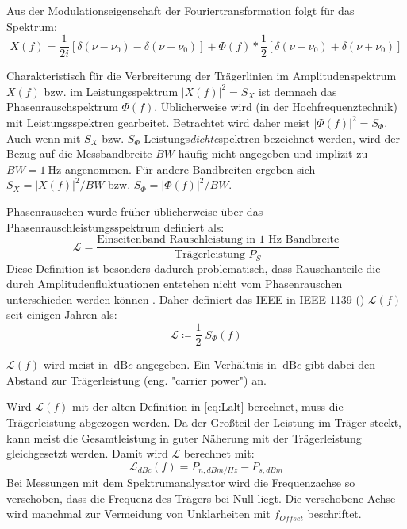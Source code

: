 Aus der Modulationseigenschaft der Fouriertransformation folgt für das Spektrum:
\begin{equation}
	X(f) = \frac{1}{2 i} \left[ \delta(\nu-\nu_0) - \delta(\nu+\nu_0) \right] + \Phi(f) * \frac{1}{2} \left[ \delta(\nu-\nu_0) + \delta(\nu+\nu_0) \right]
\end{equation}

Charakteristisch für die Verbreiterung der Trägerlinien im Amplitudenspektrum $X(f)$ bzw. im Leistungsspektrum $|X(f)|^2=S_X$ ist demnach das Phasenrauschspektrum $\Phi(f)$. Üblicherweise wird (in der Hochfrequenztechnik) mit Leistungsspektren gearbeitet. Betrachtet wird daher meist $|\Phi(f)|^2=S_\Phi$. Auch wenn mit $S_X$ bzw. $S_\Phi$ Leistungs\textit{dichte}spektren bezeichnet werden, wird der Bezug auf die Messbandbreite $BW$ häufig nicht angegeben und implizit zu $BW=\SI{1}{\hertz}$ angenommen. Für andere Bandbreiten ergeben sich $S_X=|X(f)|^2/BW$ bzw. $S_\Phi=|\Phi(f)|^2/BW$.

Phasenrauschen wurde früher üblicherweise über das Phasenrauschleistungsspektrum definiert als:
\begin{equation}
\label{eq:Lalt}
	\mathscr{L} = \frac{\text{Einseitenband-Rauschleistung in 1 Hz Bandbreite}}{\text{Trägerleistung } P_S}
\end{equation}
Diese Definition ist besonders dadurch problematisch, dass Rauschanteile die durch Amplitudenfluktuationen entstehen nicht vom Phasenrauschen unterschieden werden können \cite{Rubiola2008}. Daher definiert das IEEE in IEEE-1139 (\cite{IEEErandom}) $\mathscr{L}(f)$ seit einigen Jahren als:
\begin{equation}
\label{eq:Lneu}
	\mathscr{L} \coloneqq \frac{1}{2} \; S_\Phi(f)
\end{equation}

$\mathscr{L}(f)$ wird meist in $\SI{}{\dB c}$ angegeben. Ein Verhältnis in $\SI{}{\dB c}$ gibt dabei den Abstand zur Trägerleistung (eng. "carrier power") an.

Wird $\mathscr{L}(f)$ mit der alten Definition in \autoref{eq:Lalt} berechnet, muss die Trägerleistung abgezogen werden.
Da der Großteil der Leistung im Träger steckt, kann meist die Gesamtleistung in guter Näherung mit der Trägerleistung gleichgesetzt werden. Damit wird $\mathscr{L}$ berechnet mit:
\begin{equation}
	\mathscr{L}_{dBc}(f) = P_{n, dBm/Hz} - P_{s, dBm}
\end{equation}
Bei Messungen mit dem Spektrumanalysator wird die Frequenzachse so verschoben, dass die Frequenz des Trägers bei Null liegt. Die verschobene Achse wird manchmal zur Vermeidung von Unklarheiten mit $f_{Offset}$ beschriftet.

